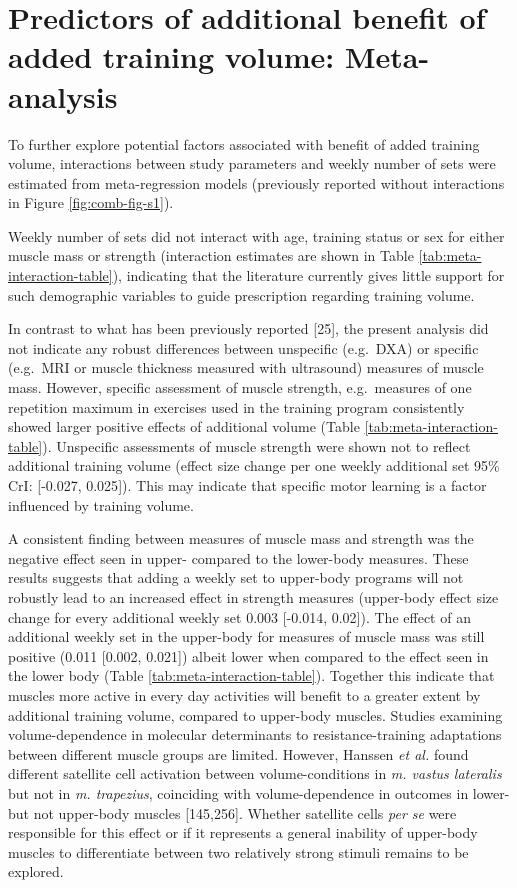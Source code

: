 \documentclass[twoside,10pt]{gihclass} %
\begin{document}
\hypertarget{predictors-of-additional-benefit-of-added-training-volume-meta-analysis}{%
\section{Predictors of additional benefit of added training volume: Meta-analysis}\label{predictors-of-additional-benefit-of-added-training-volume-meta-analysis}}

To further explore potential factors associated with benefit of added training volume, interactions between study parameters and weekly number of sets were estimated from meta-regression models (previously reported without interactions in Figure \ref{fig:comb-fig-s1}).

Weekly number of sets did not interact with age, training status or sex for either muscle mass or strength (interaction estimates are shown in Table \ref{tab:meta-interaction-table}), indicating that the literature currently gives little support for such demographic variables to guide prescription regarding training volume.

In contrast to what has been previously reported
{[}25{]},
the present analysis did not indicate any robust differences between unspecific (e.g.~DXA) or specific (e.g.~MRI or muscle thickness measured with ultrasound) measures of muscle mass.
However, specific assessment of muscle strength, e.g.~measures of one repetition maximum in exercises used in the training program consistently showed larger positive effects of additional volume (Table \ref{tab:meta-interaction-table}).
Unspecific assessments of muscle strength were shown not to reflect additional training volume (effect size change per one weekly additional set 95\% CrI: {[}-0.027, 0.025{]}). This may indicate that specific motor learning is a factor influenced by training volume.

A consistent finding between measures of muscle mass and strength was the negative effect seen in upper- compared to the lower-body measures.
These results suggests that adding a weekly set to upper-body programs will not robustly lead to an increased effect in strength measures (upper-body effect size change for every additional weekly set 0.003 {[}-0.014, 0.02{]}).
The effect of an additional weekly set in the upper-body for measures of muscle mass was still positive (0.011 {[}0.002, 0.021{]}) albeit lower when compared to the effect seen in the lower body (Table \ref{tab:meta-interaction-table}).
Together this indicate that muscles more active in every day activities will benefit to a greater extent by additional training volume, compared to upper-body muscles.
Studies examining volume-dependence in molecular determinants to resistance-training adaptations between different muscle groups are limited.
However, Hanssen \emph{et al.} found different satellite cell activation between volume-conditions in \emph{m. vastus lateralis} but not in \emph{m. trapezius}, coinciding with volume-dependence in outcomes in lower- but not upper-body muscles
{[}145,256{]}.
Whether satellite cells \emph{per se} were responsible for this effect or if it represents a general inability of upper-body muscles to differentiate between two relatively strong stimuli remains to be explored.
\end{document}
